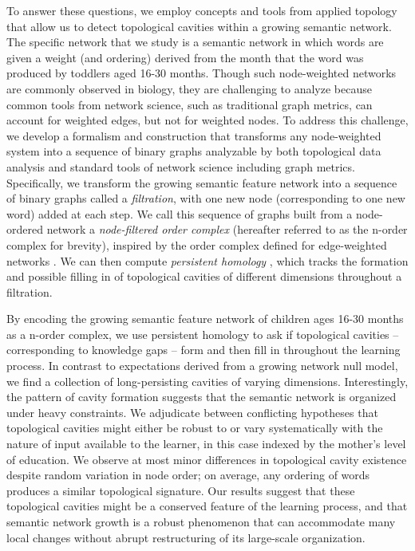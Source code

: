 \documentclass{article}
\begin{document}
To answer these questions, we employ concepts and tools from applied topology that allow us to detect topological cavities within a growing semantic network. The specific network that we study is a semantic network in which words are given a weight (and ordering) derived from the month that the word was produced by toddlers aged 16-30 months. Though such node-weighted networks are commonly observed in biology, they are challenging to analyze because common tools from network science, such as traditional graph metrics, can account for weighted edges, but not for weighted nodes. To address this challenge, we develop a formalism and construction that transforms any node-weighted system into a sequence of binary graphs analyzable by both topological data analysis and standard tools of network science including graph metrics. Specifically, we transform the growing semantic feature network into a sequence of binary graphs called a \emph{filtration}, with one new node (corresponding to one new word) added at each step. We call this sequence of graphs built from a node-ordered network a \emph{node-filtered order complex} (hereafter referred to as the n-order complex for brevity), inspired by the order complex defined for edge-weighted networks \cite{giusti2015clique}. We can then compute \emph{persistent homology} \cite{carlsson2009topology,zomorodian2005computing}, which tracks the formation and possible filling in of topological cavities of different dimensions throughout a filtration.


By encoding the growing semantic feature network of children ages 16-30 months as a n-order complex, we use persistent homology to ask if topological cavities -- corresponding to knowledge gaps -- form and then fill in throughout the learning process. In contrast to expectations derived from a growing network null model, we find a collection of long-persisting cavities of varying dimensions. Interestingly, the pattern of cavity formation suggests that the semantic network is organized under heavy constraints. We adjudicate between conflicting hypotheses that topological cavities might either be robust to or vary systematically with the nature of input available to the learner, in this case indexed by the mother's level of education. We observe at most minor differences in topological cavity existence despite random variation in node order; on average, any ordering of words produces a similar topological signature. Our results suggest that these topological cavities might be a conserved feature of the learning process, and that semantic network growth is a robust phenomenon that can accommodate many local changes without abrupt restructuring of its large-scale organization.
\end{document}
